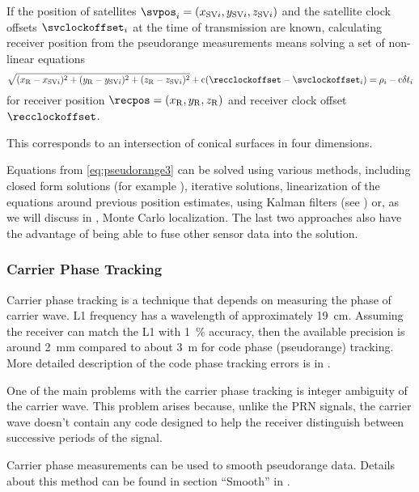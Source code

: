 If the position of satellites \(\svpos_i = \coord{x_{{\SV}i}}{y_{{\SV}i}}{z_{{\SV}i}}\) and the satellite
clock offsets \(\svclockoffset_i\) at the time of transmission are known,
calculating receiver position from the pseudorange measurements means solving a set of non-linear equations
\begin{equation}
	\label{eq:pseudorange3}
	\sqrt{(x_\REC - x_{{\SV}i})^2 + (y_\REC - y_{{\SV}i})^2 +(z_\REC - z_{{\SV}i})^2} +
	\speedoflight (\recclockoffset - \svclockoffset_i)
	=
	\rho_i - \speedoflight\geomrangedelays_i
\end{equation}
for receiver position \(\recpos = \coord{x_\REC}{y_\REC}{z_\REC}\) and receiver clock offset \(\recclockoffset\).

This corresponds to an intersection of conical surfaces in four dimensions.

Equations from \eqref{eq:pseudorange3} can be solved using various methods, including closed form solutions
(for example \cite{leva96}), iterative solutions, linearization of the equations around
previous position estimates, using Kalman filters (see ) or,
as we will discuss in , Monte Carlo localization.
The last two approaches also have the advantage of being able to fuse other sensor data
into the solution.

\subsubsection{Carrier Phase Tracking}
\label{sec:gps-carrier-phase}

Carrier phase tracking is a technique that depends on measuring the phase of carrier wave.
L1 frequency has a wavelength of approximately \SI{19}{\centi\meter}.
Assuming the receiver can match the L1 with \SI{1}{\percent} accuracy, then the available precision
is around \SI{2}{\milli\meter} compared to about \SI{3}{\meter} for code phase (pseudorange)
tracking. More detailed description of the code phase tracking errors is in .

One of the main problems with the carrier phase tracking is integer ambiguity of the carrier wave.
This problem arises because, unlike the PRN signals, the carrier wave doesn't contain any code designed to
help the receiver distinguish between successive periods of the signal.

Carrier phase measurements can be used to smooth pseudorange data.
Details about this method can be found in section \enquote{Smooth} in \cite{sam-www}.

